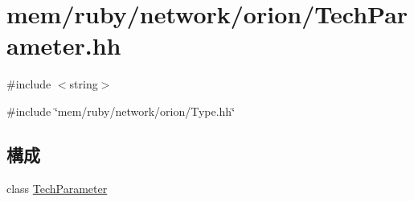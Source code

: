 \hypertarget{TechParameter_8hh}{
\section{mem/ruby/network/orion/TechParameter.hh}
\label{TechParameter_8hh}
}
{\ttfamily \#include $<$string$>$}\par
{\ttfamily \#include \char`\"{}mem/ruby/network/orion/Type.hh\char`\"{}}\par
\subsection*{構成}
\begin{DoxyCompactItemize}
\item 
class \hyperlink{classTechParameter}{TechParameter}
\end{DoxyCompactItemize}
